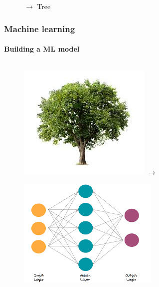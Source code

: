 \documentclass[aspectratio=43]{beamer}
\begin{document}
\begin{frame}
\begin{figure}
		\endminipage
		\hspace*{0.75cm}
		$\longrightarrow$
		{\color{darkgreen}Tree \checkmark}
		\endminipage

	\end{figure}

\end{frame}

\begin{frame}

	\frametitle{Machine learning}
	\framesubtitle{Building a ML model}
	
	\begin{figure}
		
		\begin{columns}
			\includegraphics[width = \linewidth]{plots/tree1.jpeg}
			$\longrightarrow$
		\end{columns}
		\endminipage
		\hspace*{-1.25cm}	
		\includegraphics[width = 1.25\linewidth]{plots/NN.png}

\end{figure}
\end{frame}
\end{document}
